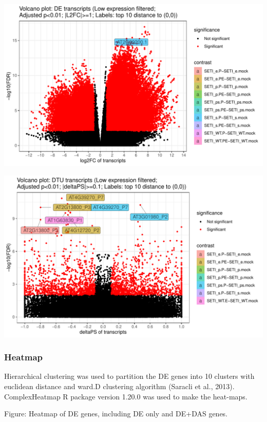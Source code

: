 \documentclass[]{article}
\begin{document}
\includegraphics[width=16.67in]{X2025.01.13.16.34.12.j145/figure/DE transcripts volcano plot}

\includegraphics[width=16.67in]{X2025.01.13.16.34.12.j145/figure/DTU transcripts volcano plot}

\subsubsection{Heatmap}\label{heatmap}

Hierarchical clustering was used to partition the DE genes into 10
clusters with euclidean distance and ward.D clustering algorithm
(Saracli et al., 2013). ComplexHeatmap R package version 1.20.0 was used
to make the heat-maps.

Figure: Heatmap of DE genes, including DE only and DE+DAS genes.
\end{document}
